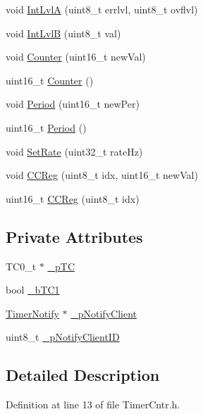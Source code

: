 \begin{DoxyCompactItemize}
void \hyperlink{class_timer_cntr_a3d9d3bca0c89f5dbc69b34406ef6c4be}{IntLvlA} (uint8\_\-t errlvl, uint8\_\-t ovflvl)
\item 
void \hyperlink{class_timer_cntr_a687162461b8b992093f3573356506a8c}{IntLvlB} (uint8\_\-t val)
\item 
void \hyperlink{class_timer_cntr_a483fd3e00603951991333699a1be67ea}{Counter} (uint16\_\-t newVal)
\item 
uint16\_\-t \hyperlink{class_timer_cntr_ae0b24888d24c907aad75ed985431f1a4}{Counter} ()
\item 
void \hyperlink{class_timer_cntr_a3f1c57b8f31a717b5de335cd56408029}{Period} (uint16\_\-t newPer)
\item 
uint16\_\-t \hyperlink{class_timer_cntr_a0b50451ff7454d77aff54ca3274c7b7c}{Period} ()
\item 
void \hyperlink{class_timer_cntr_a00b8456f413fc621b667bc0d2f825623}{SetRate} (uint32\_\-t rateHz)
\item 
void \hyperlink{class_timer_cntr_aa4cead09b55956ef48dd19fcf7a2dea0}{CCReg} (uint8\_\-t idx, uint16\_\-t newVal)
\item 
uint16\_\-t \hyperlink{class_timer_cntr_a8cedc6015da8a1082273071d2eb7c68b}{CCReg} (uint8\_\-t idx)
\end{DoxyCompactItemize}
\subsection*{Private Attributes}
\begin{DoxyCompactItemize}
\item 
TC0\_\-t $\ast$ \hyperlink{class_timer_cntr_ae29c58d2e9059e5b3cff07a26dcc5b91}{\_\-pTC}
\item 
bool \hyperlink{class_timer_cntr_a568c634a1b85c88206408c5108500c7b}{\_\-bTC1}
\item 
\hyperlink{class_timer_notify}{TimerNotify} $\ast$ \hyperlink{class_timer_cntr_ab0667571f2dab6ca9f759d9b2c8ce59f}{\_\-pNotifyClient}
\item 
uint8\_\-t \hyperlink{class_timer_cntr_a98b954b9492a11842e511fa21d0131cc}{\_\-pNotifyClientID}
\end{DoxyCompactItemize}


\subsection{Detailed Description}


Definition at line 13 of file TimerCntr.h.



